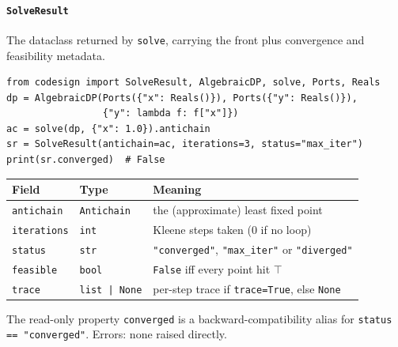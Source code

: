 \documentclass[11pt,a4paper]{article}
\newcommand{\topp}{\top}
\begin{document}
\paragraph{\texttt{SolveResult}}
\label{ref:solver:solveresult}
The dataclass returned by \texttt{solve}, carrying the front plus
convergence and feasibility metadata.
\begin{lstlisting}
from codesign import SolveResult, AlgebraicDP, solve, Ports, Reals
dp = AlgebraicDP(Ports({"x": Reals()}), Ports({"y": Reals()}),
                 {"y": lambda f: f["x"]})
ac = solve(dp, {"x": 1.0}).antichain
sr = SolveResult(antichain=ac, iterations=3, status="max_iter")
print(sr.converged)  # False
\end{lstlisting}
\begin{center}
\begin{tabular}{@{}lll@{}}
\toprule
Field & Type & Meaning \\
\midrule
\texttt{antichain} & \texttt{Antichain} & the (approximate) least fixed
  point \\
\texttt{iterations} & \texttt{int} & Kleene steps taken (0 if no loop) \\
\texttt{status} & \texttt{str} & \texttt{"converged"}, \texttt{"max\_iter"}
  or \texttt{"diverged"} \\
\texttt{feasible} & \texttt{bool} & \texttt{False} iff every point hit
  $\topp$ \\
\texttt{trace} & \texttt{list | None} & per-step trace if
  \texttt{trace=True}, else \texttt{None} \\
\bottomrule
\end{tabular}
\end{center}
The read-only property \texttt{converged} is a
backward-compatibility alias for \texttt{status == "converged"}.
Errors: none raised directly.
\end{document}

